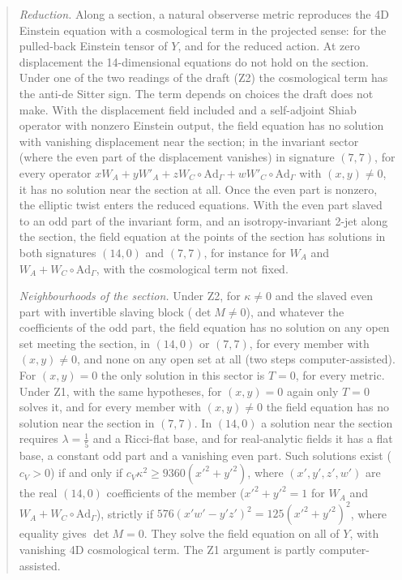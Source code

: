 \documentclass[11pt]{article}
\theoremstyle{remark}
\begin{document}
\begin{abstract}
\emph{Reduction.} Along a section, a natural observerse metric reproduces the 4D Einstein equation with a cosmological term in the projected sense: for the pulled-back Einstein tensor of $Y$, and for the reduced action. At zero displacement the 14-dimensional equations do not hold on the section. Under one of the two readings of the draft (Z2) the cosmological term has the anti-de Sitter sign. The term depends on choices the draft does not make. With the displacement field included and a self-adjoint Shiab operator with nonzero Einstein output, the field equation has no solution with vanishing displacement near the section; in the invariant sector (where the even part of the displacement vanishes) in signature $(7,7)$, for every operator $xW_A+yW'_A+zW_C\circ\mathrm{Ad}_\Gamma+wW'_C\circ\mathrm{Ad}_\Gamma$ with $(x,y)\neq0$, it has no solution near the section at all. Once the even part is nonzero, the elliptic twist enters the reduced equations. With the even part slaved to an odd part of the invariant form, and an isotropy-invariant 2-jet along the section, the field equation at the points of the section has solutions in both signatures $(14,0)$ and $(7,7)$, for instance for $W_A$ and $W_A+W_C\circ\mathrm{Ad}_\Gamma$, with the cosmological term not fixed.

\emph{Neighbourhoods of the section.} Under Z2, for $\kappa\neq0$ and the slaved even part with invertible slaving block ($\det M\neq0$), and whatever the coefficients of the odd part, the field equation has no solution on any open set meeting the section, in $(14,0)$ or $(7,7)$, for every member with $(x,y)\neq0$, and none on any open set at all (two steps computer-assisted). For $(x,y)=0$ the only solution in this sector is $T=0$, for every metric. Under Z1, with the same hypotheses, for $(x,y)=0$ again only $T=0$ solves it, and for every member with $(x,y)\neq0$ the field equation has no solution near the section in $(7,7)$. In $(14,0)$ a solution near the section requires $\lambda=\tfrac15$ and a Ricci-flat base, and for real-analytic fields it has a flat base, a constant odd part and a vanishing even part. Such solutions exist ($c_V>0$) if and only if $c_V\kappa^2\ge9360(x'^2+y'^2)$, where $(x',y',z',w')$ are the real $(14,0)$ coefficients of the member ($x'^2+y'^2=1$ for $W_A$ and $W_A+W_C\circ\mathrm{Ad}_\Gamma$), strictly if $576(x'w'-y'z')^2=125(x'^2+y'^2)^2$, where equality gives $\det M=0$. They solve the field equation on all of $Y$, with vanishing 4D cosmological term. The Z1 argument is partly computer-assisted.


\end{abstract}
\end{document}
